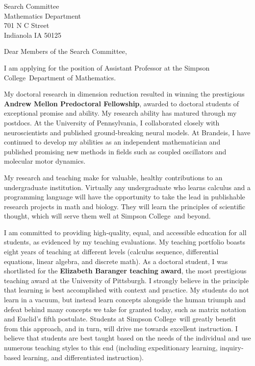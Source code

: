 \documentclass[11pt,a4paper]{letter}
\begin{document}

\def\School{Simpson College}

\begin{letter}
{Search Committee\\
Mathematics Department\\
701 N C Street\\
Indianola IA 50125}


\opening{Dear Members of the Search Committee,}


I am applying for the position of Assistant Professor at the \School~Department of Mathematics. 

My doctoral research in dimension reduction resulted in winning the prestigious \textbf{Andrew Mellon Predoctoral Fellowship}, awarded to doctoral students of exceptional promise and ability. My research ability has matured through my postdocs. At the University of Pennsylvania, I collaborated closely with neuroscientists and published ground-breaking neural models. At Brandeis, I have continued to develop my abilities as an independent mathematician and published promising new methods in fields such as coupled oscillators and molecular motor dynamics.

My research and teaching make for valuable, healthy contributions to an undergraduate institution. Virtually any undergraduate who learns calculus and a programming language will have the opportunity to take the lead in publishable research projects in math and biology. They will learn the principles of scientific thought, which will serve them well at \School~and beyond.

I am committed to providing high-quality, equal, and accessible education for all students, as evidenced by my teaching evaluations. My teaching portfolio boasts eight years of teaching at different levels (calculus sequence, differential equations, linear algebra, and discrete math). As a doctoral student, I was shortlisted for the \textbf{Elizabeth Baranger teaching award}, the most prestigious teaching award at the University of Pittsburgh. I strongly believe in the principle that learning is best accomplished with context and practice. My students do not learn in a vacuum, but instead learn concepts alongside the human triumph and defeat behind many concepts we take for granted today, such as matrix notation and Euclid's fifth postulate. Students at \School~will greatly benefit from this approach, and in turn, will drive me towards excellent instruction. I believe that students are best taught based on the needs of the individual and use numerous teaching styles to this end (including expeditionary learning, inquiry-based learning, and differentiated instruction).


\end{letter}
\end{document}
